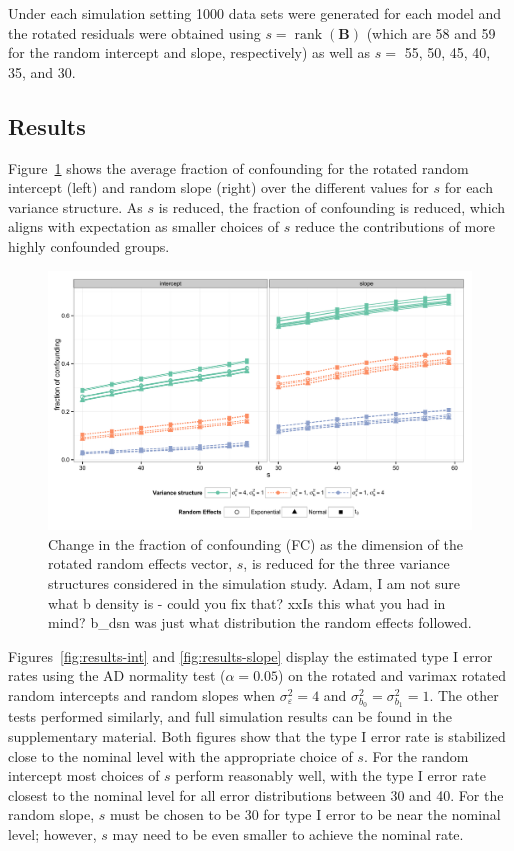 \documentclass[12pt]{article} %
\newcommand{\hh}[1]{{\color{orange} #1}}
\newcommand{\al}[1]{{\color{red} #1}}
\DeclareMathOperator{\rank}{rank}
\begin{document}
Under each simulation setting 1000 data sets were generated for each model and the rotated residuals were obtained using $s = \rank(\bm{B})$ (which are 58 and 59 for the random intercept and slope, respectively) as well as $s =$ 55, 50, 45, 40, 35, and 30.


\subsection{Results}\label{sec:sim-results}

Figure~\ref{fig:fc} shows the average fraction of confounding for the rotated random intercept (left) and random slope (right) over the different values for $s$ for each variance structure. As $s$ is reduced, the fraction of confounding is reduced, which aligns with expectation as smaller choices of $s$ reduce the contributions of more highly confounded groups.

\begin{figure}[h]
	\centering
	\includegraphics[width=\textwidth]{fc_by_s.pdf}
	\caption{\label{fig:fc} Change in the fraction of confounding (FC) as the dimension of the rotated random effects vector, $s$, is reduced for the three variance structures considered in the simulation study. %
	\hh{Adam, I am not sure what b density is - could you fix that?} \al{ xxIs this what you had in mind? b\_dsn was just what distribution the random effects followed.}
	}
\end{figure}

Figures~\ref{fig:results-int} and \ref{fig:results-slope} display the estimated type I error rates using the AD normality test ($\alpha = 0.05$) on the rotated and varimax rotated random intercepts and random slopes when $\sigma^2_\varepsilon = 4$ and $\sigma^2_{b_0} = \sigma^2_{b_1} = 1$. The other tests performed similarly, and full simulation results can be found in the supplementary material. Both figures show that the type I error rate is stabilized close to the nominal level with the appropriate choice of $s$. For the random intercept most choices of $s$ perform reasonably well, with the type I error rate closest to the nominal level for all error distributions between 30 and 40. For the random slope, $s$ must be chosen to be 30 for type I error to be near the nominal level; however, $s$ may need to be even smaller to achieve the nominal rate. 
\end{document}
